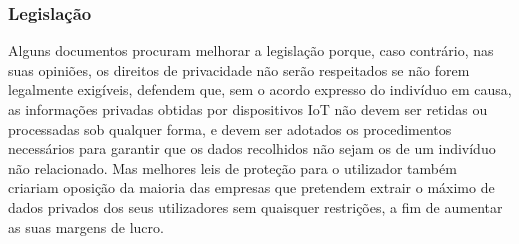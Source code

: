 \documentclass[conference]{IEEEtran}
\begin{document}

\subsubsection{Legislação}

Alguns documentos procuram melhorar a legislação \cite{WEBER2015618, FabianoInternet}
porque, caso contrário, nas suas opiniões, os direitos de privacidade não serão
respeitados se não forem legalmente exigíveis, defendem que, sem o acordo expresso
do indivíduo em causa, as informações privadas obtidas por dispositivos IoT
não devem ser retidas ou processadas sob qualquer forma, e devem ser adotados
os procedimentos necessários para garantir que os dados recolhidos não sejam
os de um indivíduo não relacionado. Mas melhores leis de proteção para o utilizador
também criariam oposição da maioria das empresas que pretendem extrair o máximo
de dados privados dos seus utilizadores sem quaisquer restrições, a fim de
aumentar as suas margens de lucro.

\end{document}
